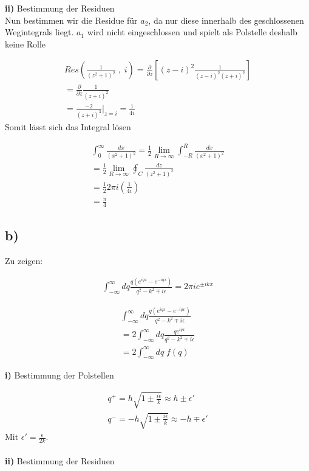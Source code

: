 \textbf{ii)} Bestimmung der Residuen \\
Nun bestimmen wir die Residue f\"ur $a_2$, da nur diese innerhalb des
geschlossenen Wegintegrals liegt. $a_1$ wird nicht eingeschlossen und spielt als
Polstelle deshalb keine Rolle

\begin{align}
Res \left( \frac{1}{\left(z^2+1\right)^2} \; , \; i \right) =
\frac{\partial}{\partial z} \left[ \left(z-i\right)^2
\frac{1}{\left(z-i\right)^2 \left(z+i\right)^2} \right] \\
= \frac{\partial}{\partial z} \frac{1}{\left(z+i\right)^2} \\
= \frac{-2}{\left(z+i\right)^3} \bigg|_{z=i} = \frac{1}{4i}
\end{align}
Somit l\"asst sich das Integral l\"osen

\begin{align}
\int_0^{\infty} \frac{dx}{\left(x^2+1\right)^2} = \frac{1}{2} \lim \limits_{R
\rightarrow \infty} \int_{-R}^{R} \frac{dx}{\left(x^2+1\right)^2} \\
= \frac{1}{2} \lim \limits_{R \rightarrow \infty} \oint_C
\frac{dz}{\left(z^2+1\right)^2} \\
= \frac{1}{2} 2 \pi i \left( \frac{1}{4i} \right) \\
= \frac{\pi}{4}
\end{align}

\subsection{b)}
Zu zeigen:

\begin{align}
\int_{-\infty}^{\infty} dq \frac{q \left(e^{iqx}-e^{-iqx}\right)}{q^2 -k^2 \mp
i\epsilon} = 2  \pi i e^{\pm ikx}
\end{align}

\begin{align}
\int_{-\infty}^{\infty} dq \frac{q \left(e^{iqx}-e^{-iqx}\right)}{q^2 -k^2 \mp
i\epsilon} \\
= 2 \int_{-\infty}^{\infty} dq \frac{q e^{iqx}}{q^2 -k^2 \mp
i\epsilon} \\
= 2 \int_{-\infty}^{\infty} dq \; f \left(q\right)
\end{align}

\textbf{i)} Bestimmung der Polstellen

\begin{align}
q^+ = h \sqrt{1 \pm \frac{i\epsilon}{k}} \approx h \pm \epsilon ' \\
q^- = -h \sqrt{1 \pm \frac{i\epsilon}{k}} \approx -h \mp \epsilon '
\end{align}
Mit $\epsilon ' = \frac{\epsilon}{2k}$. \\
\\
\textbf{ii)} Bestimmung der Residuen \\

